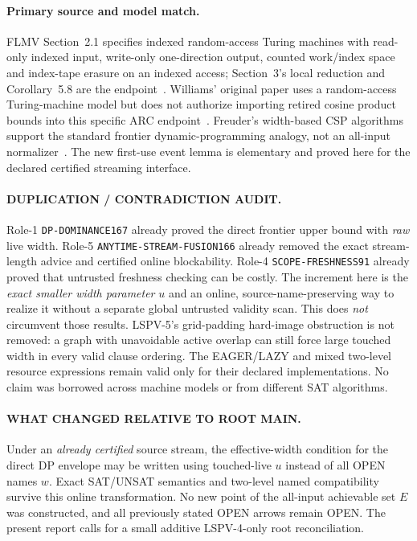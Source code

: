 \documentclass[11pt]{article}
\begin{document}
\paragraph{Primary source and model match.}
FLMV Section~2.1 specifies indexed random-access Turing
machines with read-only indexed input, write-only one-direction
output, counted work/index space and index-tape erasure on
an indexed access; Section~3's local reduction and
Corollary~5.8 are the endpoint~\cite{flmv}.
Williams' original paper uses a random-access Turing-machine
model but does not authorize importing retired cosine
product bounds into this specific ARC endpoint~\cite{williams}.
Freuder's width-based CSP algorithms support the standard
frontier dynamic-programming analogy, not an all-input
normalizer~\cite{freuder}.
The new first-use event lemma is elementary and proved
here for the declared certified streaming interface.

\paragraph{DUPLICATION / CONTRADICTION AUDIT.}
Role-1 \texttt{DP-DOMINANCE167} already proved the direct
frontier upper bound with \emph{raw} live width.
Role-5 \texttt{ANYTIME-STREAM-FUSION166} already removed
the exact stream-length advice and certified online
blockability. Role-4 \texttt{SCOPE-FRESHNESS91} already
proved that untrusted freshness checking can be costly.
The increment here is the \emph{exact smaller width parameter}
$u$ and an online, source-name-preserving way to realize it
without a separate global untrusted validity scan.
This does \emph{not} circumvent those results.
LSPV-5's grid-padding hard-image obstruction is not
removed: a graph with unavoidable active overlap can still
force large touched width in every valid clause ordering.
The EAGER/LAZY and mixed two-level resource expressions
remain valid only for their declared implementations.
No claim was borrowed across machine models or from
different SAT algorithms.

\paragraph{WHAT CHANGED RELATIVE TO ROOT MAIN.}
Under an \emph{already certified} source stream,
the effective-width condition for the direct DP envelope
may be written using touched-live $u$ instead of all OPEN
names $w$. Exact SAT/UNSAT semantics and two-level named
compatibility survive this online transformation.
No new point of the all-input achievable set $E$ was
constructed, and all previously stated OPEN arrows remain
OPEN. The present report calls for a small additive
LSPV-4-only root reconciliation.
\end{document}

